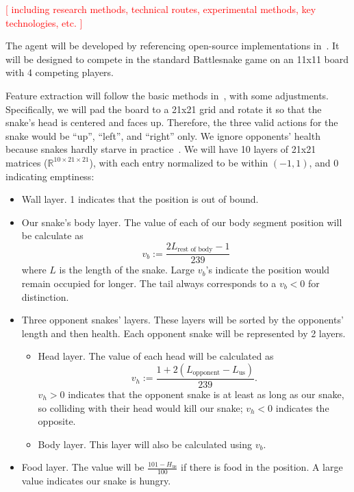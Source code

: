 \documentclass[a4paper]{article}
\newcommand{\todo}[1]{\textcolor{red}{[ #1 ]}}
\begin{document}
\todo{including research methods, technical routes, experimental methods,
    key technologies, etc.}

The agent will be developed by referencing open-source implementations
in~\cite{siddiqui2020multiagent,chung2020battlesnake,wrenger2024rusty}.
It will be designed to compete in the standard Battlesnake game on an 11x11
board with 4 competing players.

Feature extraction will follow the basic methods
in~\cite{siddiqui2020multiagent,archinukmonte}, with some adjustments.
Specifically,
we will pad the board to a 21x21 grid and rotate it so that the snake's head is
centered and faces up. Therefore,
the three valid actions for the snake would be ``up'', ``left'',
and ``right'' only.
We ignore opponents' health because snakes hardly starve in
practice~\cite{siddiqui2020multiagent}.
We will have 10 layers of 21x21 matrices ($\mathbb R^{10\times21\times21}$),
with each entry normalized to be within $(-1,1)$, and 0 indicating emptiness:
\begin{itemize}
    \item Wall layer. 1 indicates that the position is out of bound.
    \item Our snake's body layer.
        The value of each of our body segment position will be calculate as $$
            v_b:=\frac{2L_{\text{rest of body}}-1}{239}
        $$ where $L$ is the length of the snake.
        Large $v_b$'s indicate the position would remain occupied for longer.
        The tail always corresponds to a $v_b<0$ for distinction.
    \item Three opponent snakes' layers.
          These layers will be sorted by the opponents' length and then health.
          Each opponent snake will be represented by 2 layers. \begin{itemize}
              \item Head layer. The value of each head will be calculated as $$
                        v_h:=\frac{1+2(L_{\text{opponent}}-L_{\text{us}})}{239}.
                    $$ $v_h>0$ indicates that the opponent snake is at least as
                    long as our snake,
                    so colliding with their head would kill our snake;
                    $v_h<0$ indicates the opposite.
              \item Body layer. This layer will also be calculated using $v_b$.
          \end{itemize}
    \item Food layer.
          The value will be $\displaystyle\frac{101-H_{\text{us}}}{100}$ if
          there is food in the position.
          A large value indicates our snake is hungry.
\end{itemize}
\end{document}
